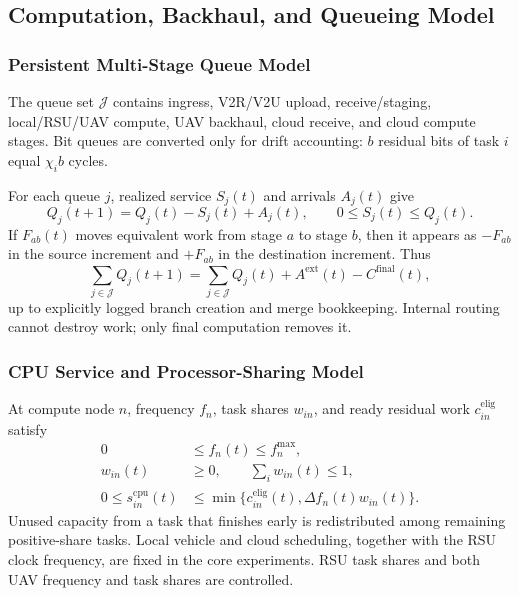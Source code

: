 \documentclass[journal]{IEEEtran}
\begin{document}
\subsection{Computation, Backhaul, and Queueing Model}
\subsubsection{Persistent Multi-Stage Queue Model}
The queue set $\mathcal J$ contains ingress, V2R/V2U upload,
receive/staging, local/RSU/UAV compute, UAV backhaul, cloud receive,
and cloud compute stages.  Bit queues are converted only for drift
accounting: $b$ residual bits of task $i$ equal $\chi_i b$ cycles.

For each queue $j$, realized service $S_j(t)$ and arrivals $A_j(t)$
give
\begin{equation}
Q_j(t+1)=Q_j(t)-S_j(t)+A_j(t),\qquad
0\le S_j(t)\le Q_j(t).
\label{eq:queue}
\end{equation}
If $F_{ab}(t)$ moves equivalent work from stage $a$ to stage $b$,
then it appears as $-F_{ab}$ in the source increment and $+F_{ab}$ in
the destination increment.  Thus
\begin{equation}
\sum_{j\in\mathcal J}Q_j(t+1)=
\sum_{j\in\mathcal J}Q_j(t)+A^{\mathrm{ext}}(t)-C^{\mathrm{final}}(t),
\label{eq:conservation}
\end{equation}
up to explicitly logged branch creation and merge bookkeeping.
Internal routing cannot destroy work; only final computation removes
it.

\subsubsection{CPU Service and Processor-Sharing Model}
At compute node $n$, frequency $f_n$, task shares $w_{in}$, and ready
residual work $c_{in}^{\mathrm{elig}}$ satisfy
\begin{equation}
\begin{aligned}
0&\le f_n(t)\le f_n^{\max},\\
w_{in}(t)&\ge0,\qquad \sum_iw_{in}(t)\le1,\\
0\le s_{in}^{\mathrm{cpu}}(t)&\le
\min\{c_{in}^{\mathrm{elig}}(t),\Delta f_n(t)w_{in}(t)\}.
\end{aligned}
\label{eq:cpu_capacity}
\end{equation}
Unused capacity from a task that finishes early is redistributed among
remaining positive-share tasks.  Local vehicle and cloud scheduling,
together with the RSU clock frequency, are fixed in the core experiments.
RSU task shares and both UAV frequency and task shares are controlled.
\end{document}
